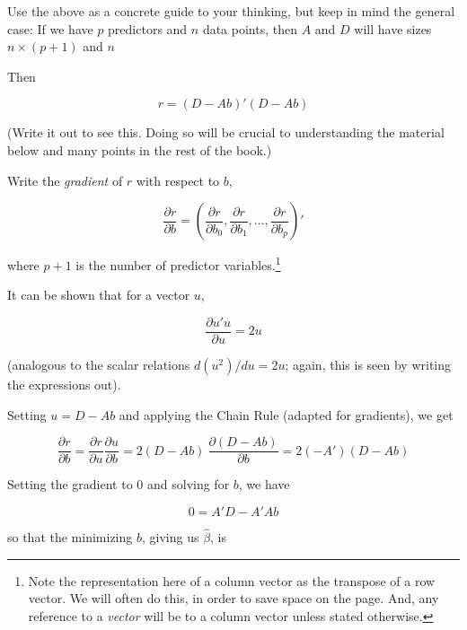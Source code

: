 Use the above as a concrete guide to your thinking, but keep in mind the
general case:  If we have $p$ predictors and $n$ data points, then $A$
and $D$ will have sizes $n \times (p+1)$ and $n$

Then

\begin{equation}
\label{dab}
r = (D - A b)' (D - Ab)
\end{equation}

(Write it out to see this.  Doing so will be crucial to understanding
the material below and many points in the rest of the book.)

Write the \textit{gradient} of $r$ with respect to $b$,

\begin{equation}
\frac{\partial r}{\partial b} = (
\frac{\partial r}{\partial b_0},
\frac{\partial r}{\partial b_1},
...,
\frac{\partial r}{\partial b_p}
)'
\end{equation}

where $p+1$ is the number of predictor variables.\footnote{Note the
representation here of a column vector as the transpose of a row vector.
We will often do this, in order to save space on the page.  And, any
reference to a \textit{vector} will be to a column vector unless stated
otherwise.}

It can be shown that for a vector $u$, 

\begin{equation}
\frac{\partial u'u}{\partial u} = 2u
\end{equation}

(analogous to the scalar relations $d (u^2) /du = 2u$; again, this is
seen by writing the expressions out).

Setting $u = D - Ab$ and applying the Chain Rule (adapted for
gradients), we get

\begin{equation}
\frac{\partial r}{\partial b} = 
\frac{\partial r}{\partial u} 
\frac{\partial u}{\partial b} =
2(D - Ab) ~ \frac{\partial (D - Ab)}{\partial b}=
2 (-A') (D - Ab) 
\end{equation}

Setting the gradient to 0 and solving for $b$, we have

\begin{equation}
\label{adaab}
0 = A'D - A'Ab
\end{equation}  

so that the minimizing $b$, giving us $\widehat{\beta}$, is

